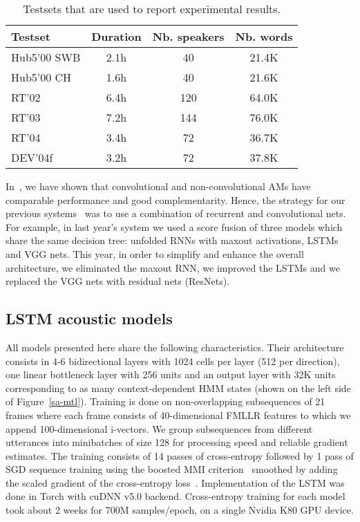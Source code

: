 \documentclass[a4paper]{article}
\begin{document}
\begin{table}[htpb!]
\begin{center}
\begin{tabular}{|l|c|c|c|} \hline
Testset     & Duration & Nb. speakers & Nb. words      \\ \hline
Hub5'00 SWB & 2.1h & 40 & 21.4K       \\ \hline
Hub5'00 CH  & 1.6h & 40 & 21.6K \\ \hline
RT'02       & 6.4h &120 & 64.0K \\ \hline
RT'03       & 7.2h &144 & 76.0K \\ \hline
RT'04       & 3.4h &72  & 36.7K \\ \hline
DEV'04f     & 3.2h &72  & 37.8K \\ \hline
\end{tabular}
\end{center}
\caption{\label{testsets}
Testsets that are used to report experimental results.}
\end{table}

In~\cite{soltau14}, we have shown that convolutional and
non-convolutional AMs have comparable performance and good
complementarity. Hence, the strategy for our previous
systems~\cite{saon15,saon16} was to use a combination of recurrent and
convolutional nets. For example, in last year's system we used a score
fusion of three models which share the same decision tree: unfolded
RNNs with maxout activations, LSTMs and VGG nets. This year, in order
to simplify and enhance the overall architecture, we eliminated the
maxout RNN, we improved the LSTMs and we replaced the VGG nets with
residual nets (ResNets).

\subsection{LSTM acoustic models}
All models presented here share the following characteristics. Their
architecture consists in 4-6 bidirectional layers with 1024 cells per
layer (512 per direction), one linear bottleneck layer with 256 units
and an output layer with 32K units corresponding to as many
context-dependent HMM states (shown on the left side of
Figure~\ref{sa-mtl}). Training is done on non-overlapping subsequences
of 21 frames where each frame consists of 40-dimensional FMLLR
features to which we append 100-dimensional i-vectors. We group
subsequences from different utterances into minibatches of size 128
for processing speed and reliable gradient estimates. The training
consists of 14 passes of cross-entropy followed by 1 pass of SGD
sequence training using the boosted MMI criterion~\cite{povey08}
smoothed by adding the scaled gradient of the cross-entropy
loss~\cite{su2013error}. Implementation of the LSTM was done in Torch
\cite{collobert2011torch7} with cuDNN v5.0 backend.  Cross-entropy
training for each model took about 2 weeks for 700M samples/epoch, on a
single Nvidia K80 GPU device.
\end{document}

